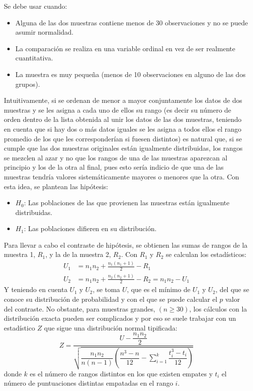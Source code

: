 Se debe usar cuando:
\begin{itemize}
\item Alguna de las dos muestras contiene menos de 30 observaciones y no se puede asumir normalidad.
\item La comparación se realiza en una variable ordinal en vez de ser realmente cuantitativa.
\item La muestra es muy pequeña (menos de 10 observaciones en alguno de las dos grupos).
\end{itemize}

Intuitivamente, si se ordenan de menor a mayor conjuntamente los datos de dos muestras y se les asigna a cada uno de ellos su rango (es
decir su número de orden dentro de la lista obtenida al unir los datos de las dos muestras, teniendo en cuenta que si hay dos o más datos
iguales se les asigna a todos ellos el rango promedio de los que les corresponderían si fuesen distintos) es natural que, si se cumple que
las dos muestras originales están igualmente distribuidas, los rangos se mezclen al azar y no que los rangos de una de las muestras
aparezcan al principio y los de la otra al final, pues esto sería indicio de que una de las muestras tendría valores sistemáticamente
mayores o menores que la otra. Con esta idea, se plantean las hipótesis:
\begin{itemize}
\item $H_0$: Las poblaciones de las que provienen las muestras están igualmente distribuidas.
\item $H_1$: Las poblaciones difieren en su distribución.
\end{itemize}

Para llevar a cabo el contraste de hipótesis, se obtienen las sumas de rangos de la muestra 1, $R_1$, y la de la muestra 2, $R_2$. Con $R_1$
y $R_2$ se calculan los estadísticos:
\begin{align*}
U_1  &= n_1 n_2  + \frac{{n_1 \left( {n_1  + 1} \right)}}{2} - R_1\\
U_2  &= n_1 n_2  + \frac{{n_2 \left( {n_2  + 1} \right)}}{2} - R_2  = n_1 n_2  - U_1
\end{align*}
Y teniendo en cuenta $U_1$ y $U_2$, se toma $U$, que es el mínimo de $U_1$ y $U_2$, del que se conoce su distribución de probabilidad y con
el que se puede calcular el $p$ valor del contraste. No obstante, para muestras grandes, $(n\geq30)$, los cálculos con la distribución
exacta pueden ser complicados y por eso se suele trabajar con un estadístico $Z$ que sigue una distribución normal tipificada:
\[
Z = \dfrac{{U - \dfrac{{n_1 n_2 }}{2}}}{{\sqrt {\dfrac{{n_1 n_2 }}{{n\left( {n - 1} \right)}}\left( {\dfrac{{n^3  - n}}{{12}} -
\sum\limits_{i = 1}^k {\dfrac{{t_i ^3  - t_i  }}{{12}}} } \right)} }} 
\]
donde $k$ es el número de rangos distintos en los que existen empates y $t_i$ el número de puntuaciones distintas empatadas en el rango $i$.

